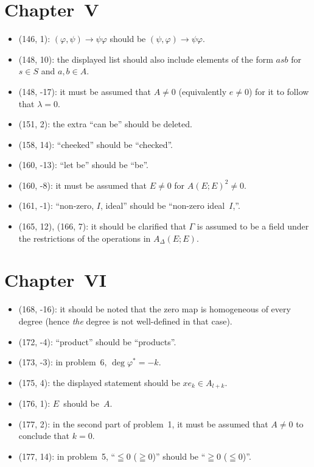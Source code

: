 \documentclass[letterpaper,12pt]{article}
\begin{document}
\section*{Chapter~V}
\begin{itemize}
\item (146, 1): \((\varphi,\psi)\to\psi\varphi\) should be \((\psi,\varphi)\to\psi\varphi\).
\item (148, 10): the displayed list should also include elements of the form \(asb\) for \(s\in S\) and \(a,b\in A\).
\item (148, -17): it must be assumed that \(A\ne 0\) (equivalently \(e\ne 0\)) for it to follow that \(\lambda=0\).
\item (151, 2): the extra ``can be'' should be deleted.
\item (158, 14): ``cheeked'' should be ``checked''.
\item (160, -13): ``let be'' should be ``be''.
\item (160, -8): it must be assumed that \(E\ne 0\) for \(A(E;E)^2\ne 0\).
\item (161, -1): ``non-zero, \(I\), ideal'' should be ``non-zero ideal~\(I\),''.
\item (165, 12), (166, 7): it should be clarified that \(\Gamma\) is assumed to be a field under the restrictions of the operations in \(A_{\Delta}(E;E)\).
\end{itemize}

\section*{Chapter~VI}
\begin{itemize}
\item (168, -16): it should be noted that the zero map is homogeneous of every degree (hence \emph{the} degree is not well-defined in that case).
\item (172, -4): ``product'' should be ``products''.
\item (173, -3): in problem~6, \(\deg\varphi^*=-k\).
\item (175, 4): the displayed statement should be \(xe_k\in A_{l+k}\).
\item (176, 1): \(E\)~should be~\(A\).
\item (177, 2): in the second part of problem~1, it must be assumed that \(A\ne 0\) to conclude that \(k=0\).
\item (177, 14): in problem~5, ``\(\leqq 0\) (\(\geqq 0\))'' should be ``\(\geqq 0\) (\(\leqq 0\))''.
\end{itemize}
\end{document}
